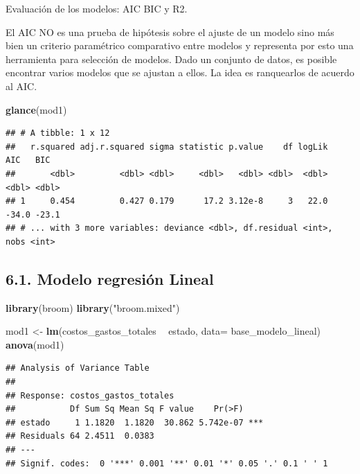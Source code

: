 \documentclass[
  11pt,
  a4paper,
]{book}
\newenvironment{Shaded}{\begin{snugshade}}{\end{snugshade}}
\newcommand{\DataTypeTok}[1]{\textcolor[rgb]{0.13,0.29,0.53}{#1}}
\newcommand{\KeywordTok}[1]{\textcolor[rgb]{0.13,0.29,0.53}{\textbf{#1}}}
\newcommand{\NormalTok}[1]{#1}
\newcommand{\OperatorTok}[1]{\textcolor[rgb]{0.81,0.36,0.00}{\textbf{#1}}}
\newcommand{\StringTok}[1]{\textcolor[rgb]{0.31,0.60,0.02}{#1}}
\begin{document}
Evaluación de los modelos: AIC BIC y R2.

El AIC NO es una prueba de hipótesis sobre el ajuste de un modelo sino
más bien un criterio paramétrico comparativo entre modelos y representa
por esto una herramienta para selección de modelos. Dado un conjunto de
datos, es posible encontrar varios modelos que se ajustan a ellos. La
idea es ranquearlos de acuerdo al AIC.

\begin{Shaded}
\begin{Highlighting}[]
\KeywordTok{glance}\NormalTok{(mod1)}
\end{Highlighting}
\end{Shaded}

\begin{verbatim}
## # A tibble: 1 x 12
##   r.squared adj.r.squared sigma statistic p.value    df logLik   AIC   BIC
##       <dbl>         <dbl> <dbl>     <dbl>   <dbl> <dbl>  <dbl> <dbl> <dbl>
## 1     0.454         0.427 0.179      17.2 3.12e-8     3   22.0 -34.0 -23.1
## # ... with 3 more variables: deviance <dbl>, df.residual <int>, nobs <int>
\end{verbatim}

\hypertarget{modelo-regresiuxf3n-lineal}{%
\subsection{6.1. Modelo regresión
Lineal}\label{modelo-regresiuxf3n-lineal}}

\begin{Shaded}
\begin{Highlighting}[]
\KeywordTok{library}\NormalTok{(broom)}
\KeywordTok{library}\NormalTok{(}\StringTok{"broom.mixed"}\NormalTok{)}

\NormalTok{mod1 <-}\StringTok{ }\KeywordTok{lm}\NormalTok{(costos_gastos_totales }\OperatorTok{~}\StringTok{  }\NormalTok{estado, }\DataTypeTok{data=}\NormalTok{ base_modelo_lineal) }
\KeywordTok{anova}\NormalTok{(mod1)}
\end{Highlighting}
\end{Shaded}

\begin{verbatim}
## Analysis of Variance Table
## 
## Response: costos_gastos_totales
##           Df Sum Sq Mean Sq F value    Pr(>F)    
## estado     1 1.1820  1.1820  30.862 5.742e-07 ***
## Residuals 64 2.4511  0.0383                      
## ---
## Signif. codes:  0 '***' 0.001 '**' 0.01 '*' 0.05 '.' 0.1 ' ' 1
\end{verbatim}
\end{document}
